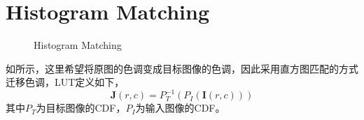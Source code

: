 \documentclass[12pt,a4paper]{article}
\begin{document}
\section{Histogram Matching}

\begin{figure}[H]
    \centering
    \caption{Histogram Matching}
    \label{fig:hist_match}
\end{figure}

如所示，这里希望将原图的色调变成目标图像的色调，因此采用直方图匹配的方式迁移色调，LUT定义如下，
\begin{equation}
    \boldsymbol{J}(r, c) = P_{T}^{-1} ( P_{I}(\boldsymbol{I}(r, c)))
\end{equation}
其中$P_T$为目标图像的CDF，$P_I$为输入图像的CDF。
\end{document}

